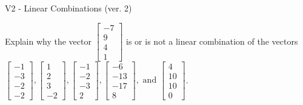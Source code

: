 \begin{exercise}
  \begin{exerciseTitle}V2 - Linear Combinations (ver. 2)\end{exerciseTitle}
  \begin{exerciseStatement}
    Explain why the vector \(\left[\begin{array}{c}
-7 \\
9 \\
4 \\
1
\end{array}\right]\)  is or is not a linear 
	combination of the vectors \(\left[\begin{array}{c}
-1 \\
-3 \\
-2 \\
-2
\end{array}\right] , \left[\begin{array}{c}
1 \\
2 \\
3 \\
-2
\end{array}\right] , \left[\begin{array}{c}
-1 \\
-2 \\
-3 \\
2
\end{array}\right] , \left[\begin{array}{c}
-6 \\
-13 \\
-17 \\
8
\end{array}\right] , \text{ and } \left[\begin{array}{c}
4 \\
10 \\
10 \\
0
\end{array}\right]\).
	



\end{exerciseStatement}
\end{exercise}
